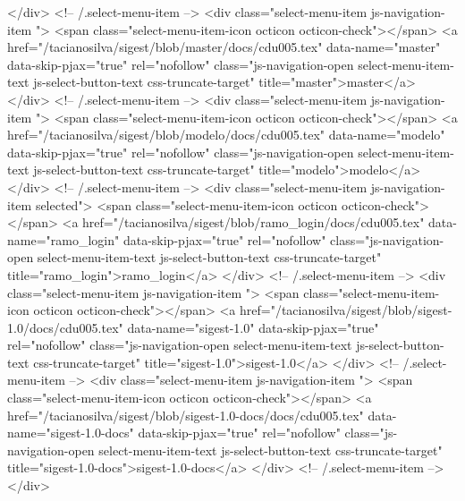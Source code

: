             </div> <!-- /.select-menu-item -->
            <div class="select-menu-item js-navigation-item ">
              <span class="select-menu-item-icon octicon octicon-check"></span>
              <a href="/tacianosilva/sigest/blob/master/docs/cdu005.tex"
                 data-name="master"
                 data-skip-pjax="true"
                 rel="nofollow"
                 class="js-navigation-open select-menu-item-text js-select-button-text css-truncate-target"
                 title="master">master</a>
            </div> <!-- /.select-menu-item -->
            <div class="select-menu-item js-navigation-item ">
              <span class="select-menu-item-icon octicon octicon-check"></span>
              <a href="/tacianosilva/sigest/blob/modelo/docs/cdu005.tex"
                 data-name="modelo"
                 data-skip-pjax="true"
                 rel="nofollow"
                 class="js-navigation-open select-menu-item-text js-select-button-text css-truncate-target"
                 title="modelo">modelo</a>
            </div> <!-- /.select-menu-item -->
            <div class="select-menu-item js-navigation-item selected">
              <span class="select-menu-item-icon octicon octicon-check"></span>
              <a href="/tacianosilva/sigest/blob/ramo_login/docs/cdu005.tex"
                 data-name="ramo_login"
                 data-skip-pjax="true"
                 rel="nofollow"
                 class="js-navigation-open select-menu-item-text js-select-button-text css-truncate-target"
                 title="ramo_login">ramo_login</a>
            </div> <!-- /.select-menu-item -->
            <div class="select-menu-item js-navigation-item ">
              <span class="select-menu-item-icon octicon octicon-check"></span>
              <a href="/tacianosilva/sigest/blob/sigest-1.0/docs/cdu005.tex"
                 data-name="sigest-1.0"
                 data-skip-pjax="true"
                 rel="nofollow"
                 class="js-navigation-open select-menu-item-text js-select-button-text css-truncate-target"
                 title="sigest-1.0">sigest-1.0</a>
            </div> <!-- /.select-menu-item -->
            <div class="select-menu-item js-navigation-item ">
              <span class="select-menu-item-icon octicon octicon-check"></span>
              <a href="/tacianosilva/sigest/blob/sigest-1.0-docs/docs/cdu005.tex"
                 data-name="sigest-1.0-docs"
                 data-skip-pjax="true"
                 rel="nofollow"
                 class="js-navigation-open select-menu-item-text js-select-button-text css-truncate-target"
                 title="sigest-1.0-docs">sigest-1.0-docs</a>
            </div> <!-- /.select-menu-item -->
        </div>

